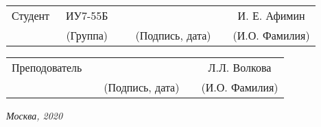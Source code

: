 \vspace{1.5cm}
\noindent
\begin{tabular}{l c c c c c}
    Студент      & ~ИУ7-55Б~               & \hspace{3.5cm} & \hspace{3.5cm}                 & &  И. Е. Афимин \\\cline{2-2}\cline{4-4} \cline{6-6} 
    \hspace{3cm} & {\footnotesize(Группа)} &                & {\footnotesize(Подпись, дата)} & & {\footnotesize(И.О. Фамилия)}
\end{tabular}

\vspace{1cm}

\noindent
\begin{tabular}{l c c c c}
    Преподователь & \hspace{6cm}   & \hspace{3.5cm}                 & & Л.Л. Волкова \\\cline{3-3} \cline{5-5} 
    \hspace{3cm}  &                & {\footnotesize(Подпись, дата)} & & {\footnotesize(И.О. Фамилия)}
\end{tabular}

\begin{center}	
	\vfill
	\large \textit {Москва, 2020}
\end{center}

\thispagestyle {empty}
\pagebreak